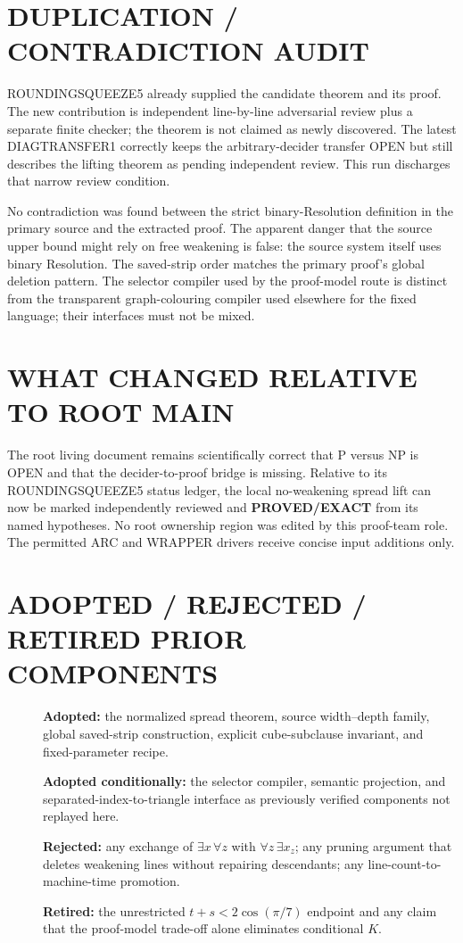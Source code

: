 \documentclass[11pt]{article}
\newcommand{\EXACT}{\textbf{PROVED/EXACT}}
\begin{document}
\section{DUPLICATION / CONTRADICTION AUDIT}
ROUNDINGSQUEEZE5 already supplied the candidate theorem and its proof.  The
new contribution is independent line-by-line adversarial review plus a
separate finite checker; the theorem is not claimed as newly discovered.
The latest DIAGTRANSFER1 correctly keeps the arbitrary-decider transfer
OPEN but still describes the lifting theorem as pending independent review.
This run discharges that narrow review condition.

No contradiction was found between the strict binary-Resolution definition
in the primary source and the extracted proof.  The apparent danger that
the source upper bound might rely on free weakening is false: the source
system itself uses binary Resolution.  The saved-strip order matches the
primary proof's global deletion pattern.  The selector compiler used by the
proof-model route is distinct from the transparent graph-colouring compiler
used elsewhere for the fixed language; their interfaces must not be mixed.

\section{WHAT CHANGED RELATIVE TO ROOT MAIN}
The root living document remains scientifically correct that P versus NP is
OPEN and that the decider-to-proof bridge is missing.  Relative to its
ROUNDINGSQUEEZE5 status ledger, the local no-weakening spread lift can now be
marked independently reviewed and \EXACT{} from its named hypotheses.  No
root ownership region was edited by this proof-team role.  The permitted
ARC and WRAPPER drivers receive concise input additions only.

\section{ADOPTED / REJECTED / RETIRED PRIOR COMPONENTS}
\begin{description}
\item[] \textbf{Adopted:} the normalized spread theorem, source
width--depth family, global saved-strip construction, explicit
cube-subclause invariant, and fixed-parameter recipe.
\item[] \textbf{Adopted conditionally:} the selector compiler, semantic
projection, and separated-index-to-triangle interface as previously
verified components not replayed here.
\item[] \textbf{Rejected:} any exchange of $\exists x\,\forall z$ with
$\forall z\,\exists x_z$; any pruning argument that deletes weakening lines
without repairing descendants; any line-count-to-machine-time promotion.
\item[] \textbf{Retired:} the unrestricted
$t+s<2\cos(\pi/7)$ endpoint and any claim that the proof-model trade-off
alone eliminates conditional $K$.
\end{description}
\end{document}
